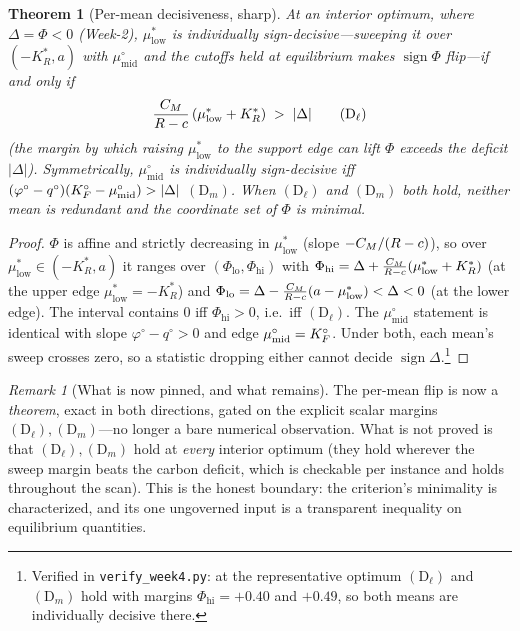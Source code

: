 \documentclass[11pt,reqno]{amsart}
\theoremstyle{plain}
\newtheorem{theorem}{Theorem}
\theoremstyle{definition}
\theoremstyle{remark}
\newtheorem{remark}{Remark}
\theoremstyle{remark}\newtheorem{observation}{Observation}
\newcommand{\KRs}{K_R^{*}}\newcommand{\KFs}{K_F^{*}}\newcommand{\KMs}{K_M^{*}}
\newcommand{\mustar}{\mu^{*}_{\mathrm{low}}}\newcommand{\mumid}{\mu^{\circ}_{\mathrm{mid}}}
\newcommand{\phio}{\varphi^{\circ}}\newcommand{\qo}{q^{\circ}}
\begin{document}
\begin{theorem}[Per-mean decisiveness, sharp]\label{thm:permean}
At an interior optimum, where $\Delta=\Phi<0$ (Week-2), $\mustar$ is individually
sign-decisive---sweeping it over $(-\KRs,a)$ with $\mumid$ and the cutoffs held at
equilibrium makes $\operatorname{sign}\Phi$ flip---\emph{if and only if}
\[
  \frac{\CM}{R-c}\,(\mustar+\KRs)\;>\;|\Delta| \tag{$\mathrm{D}_{\ell}$}
\]
(the margin by which raising $\mustar$ to the support edge can lift $\Phi$ exceeds the
deficit $|\Delta|$). Symmetrically, $\mumid$ is individually sign-decisive iff
$(\phio-\qo)(\KFo-\mumid)>|\Delta|$ $(\mathrm{D}_m)$. When $(\mathrm{D}_\ell)$ and
$(\mathrm{D}_m)$ both hold, neither mean is redundant and the coordinate set of $\Phi$ is
minimal.
\end{theorem}
\begin{proof}
$\Phi$ is affine and strictly decreasing in $\mustar$ (slope $-C_M/(R-c)$), so over
$\mustar\in(-\KRs,a)$ it ranges over $(\Phi_{\mathrm{lo}},\Phi_{\mathrm{hi}})$ with
$\Phi_{\mathrm{hi}}=\Delta+\tfrac{\CM}{R-c}(\mustar+\KRs)$ (at the upper edge
$\mustar=-\KRs$) and $\Phi_{\mathrm{lo}}=\Delta-\tfrac{\CM}{R-c}(a-\mustar)<\Delta<0$
(at the lower edge). The interval contains $0$ iff $\Phi_{\mathrm{hi}}>0$, i.e.\ iff
$(\mathrm{D}_\ell)$. The $\mumid$ statement is identical with slope $\phio-\qo>0$ and edge
$\mumid=\KFo$. Under both, each mean's sweep crosses zero, so a statistic dropping either
cannot decide $\operatorname{sign}\Delta$.\footnote{Verified in \texttt{verify\_week4.py}:
at the representative optimum $(\mathrm{D}_\ell)$ and $(\mathrm{D}_m)$ hold with margins
$\Phi_{\mathrm{hi}}=+0.40$ and $+0.49$, so both means are individually decisive there.}
\end{proof}

\begin{remark}[What is now pinned, and what remains]
The per-mean flip is now a \emph{theorem}, exact in both directions, gated on the explicit
scalar margins $(\mathrm{D}_\ell),(\mathrm{D}_m)$---no longer a bare numerical
observation. What is not proved is that $(\mathrm{D}_\ell),(\mathrm{D}_m)$ hold at
\emph{every} interior optimum (they hold wherever the sweep margin beats the carbon
deficit, which is checkable per instance and holds throughout the scan). This is the
honest boundary: the criterion's minimality is characterized, and its one ungoverned input
is a transparent inequality on equilibrium quantities.
\end{remark}

\end{document}
